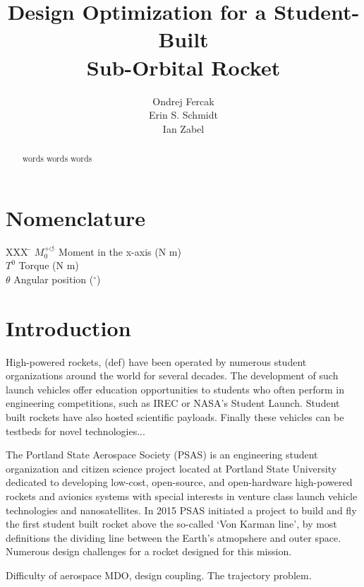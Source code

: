 \documentclass[]{aiaa-tc}%
\title{Design Optimization for a Student-Built \\ Sub-Orbital Rocket}
\author{
  Ondrej Fercak\\
  Erin S. Schmidt\\
  Ian Zabel\\  
 }
\begin{document}
\maketitle

\begin{abstract}
words words words
\end{abstract}

\section*{Nomenclature}

\begin{tabbing}
  XXX \= \kill%
  $M_0^{+ \circlearrowleft}$ \qquad Moment in the x-axis (N m)\\
  $T^0$ \qquad Torque (N m)\\
  $\theta$ \qquad Angular position (${}^{\circ}$)\\

 \end{tabbing}

\section{Introduction}
High-powered rockets, (def) have been operated by numerous student organizations around the world for several decades. The development of such launch vehicles offer education opportunities to students who often perform in engineering competitions, such as IREC or NASA's Student Launch. Student built rockets have also hosted scientific payloads. Finally these vehicles can be testbeds for novel technologies...

The Portland State Aerospace Society (PSAS) is an engineering student organization and citizen science project located at Portland State University dedicated to developing low-cost, open-source, and open-hardware high-powered rockets and avionics systems with special interests in venture class launch vehicle technologies and nanosatellites\cite{PSAS:15bk}. In 2015 PSAS initiated a project to build and fly the first student built rocket above the so-called `Von Karman line', by most definitions the dividing line between the Earth's atmopshere and outer space.\\

Numerous design challenges for a rocket designed for this mission.

Difficulty of aerospace MDO, design coupling. The trajectory problem.
\end{document}
